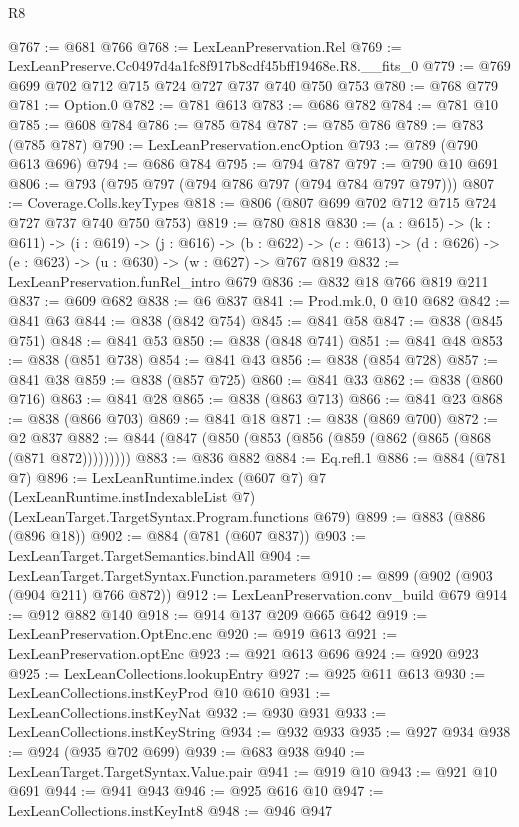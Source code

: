 \begin{lexlean}{R8}
\begin{coremodule}
@767 := @681 @766
@768 := LexLeanPreservation.Rel
@769 := LexLeanPreserve.Cc0497d4a1fc8f917b8cdf45bff19468e.R8.__fits_0
@779 := @769 @699 @702 @712 @715 @724 @727 @737 @740 @750 @753
@780 := @768 @779
@781 := Option.{0}
@782 := @781 @613
@783 := @686 @782
@784 := @781 @10
@785 := @608 @784
@786 := @785 @784
@787 := @785 @786
@789 := @783 (@785 @787)
@790 := LexLeanPreservation.encOption
@793 := @789 (@790 @613 @696)
@794 := @686 @784
@795 := @794 @787
@797 := @790 @10 @691
@806 := @793 (@795 @797 (@794 @786 @797 (@794 @784 @797 @797)))
@807 := Coverage.Colls.keyTypes
@818 := @806 (@807 @699 @702 @712 @715 @724 @727 @737 @740 @750 @753)
@819 := @780 @818
@830 := (a : @615) ->
  (k : @611) ->
  (i : @619) ->
  (j : @616) ->
  (b : @622) -> (c : @613) -> (d : @626) -> (e : @623) -> (u : @630) -> (w : @627) -> @767 @819
@832 := LexLeanPreservation.funRel_intro @679
@836 := @832 @18 @766 @819 @211
@837 := @609 @682
@838 := @6 @837
@841 := Prod.mk.{0, 0} @10 @682
@842 := @841 @63
@844 := @838 (@842 @754)
@845 := @841 @58
@847 := @838 (@845 @751)
@848 := @841 @53
@850 := @838 (@848 @741)
@851 := @841 @48
@853 := @838 (@851 @738)
@854 := @841 @43
@856 := @838 (@854 @728)
@857 := @841 @38
@859 := @838 (@857 @725)
@860 := @841 @33
@862 := @838 (@860 @716)
@863 := @841 @28
@865 := @838 (@863 @713)
@866 := @841 @23
@868 := @838 (@866 @703)
@869 := @841 @18
@871 := @838 (@869 @700)
@872 := @2 @837
@882 := @844 (@847 (@850 (@853 (@856 (@859 (@862 (@865 (@868 (@871 @872)))))))))
@883 := @836 @882
@884 := Eq.refl.{1}
@886 := @884 (@781 @7)
@896 := LexLeanRuntime.index
    (@607 @7)
    @7
    (LexLeanRuntime.instIndexableList @7)
    (LexLeanTarget.TargetSyntax.Program.functions @679)
@899 := @883 (@886 (@896 @18))
@902 := @884 (@781 (@607 @837))
@903 := LexLeanTarget.TargetSemantics.bindAll
@904 := LexLeanTarget.TargetSyntax.Function.parameters
@910 := @899 (@902 (@903 (@904 @211) @766 @872))
@912 := LexLeanPreservation.conv_build @679
@914 := @912 @882 @140
@918 := @914 @137 @209 @665 @642
@919 := LexLeanPreservation.OptEnc.enc
@920 := @919 @613
@921 := LexLeanPreservation.optEnc
@923 := @921 @613 @696
@924 := @920 @923
@925 := LexLeanCollections.lookupEntry
@927 := @925 @611 @613
@930 := LexLeanCollections.instKeyProd @10 @610
@931 := LexLeanCollections.instKeyNat
@932 := @930 @931
@933 := LexLeanCollections.instKeyString
@934 := @932 @933
@935 := @927 @934
@938 := @924 (@935 @702 @699)
@939 := @683 @938
@940 := LexLeanTarget.TargetSyntax.Value.pair
@941 := @919 @10
@943 := @921 @10 @691
@944 := @941 @943
@946 := @925 @616 @10
@947 := LexLeanCollections.instKeyInt8
@948 := @946 @947

\end{coremodule}
\end{lexlean}
